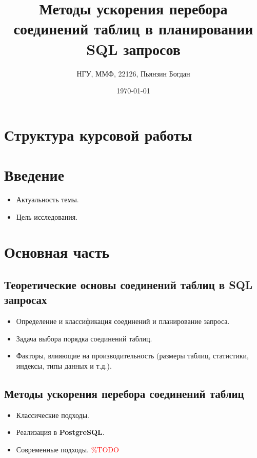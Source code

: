 \documentclass[12pt]{article}
\title{Методы ускорения перебора соединений таблиц в планировании SQL запросов}
\author{НГУ, ММФ, 22126, Пьянзин Богдан}
\date{\today}
\begin{document}
\begin{flushleft}
\maketitle

\newpage


\section*{Структура курсовой работы}  %

\section*{Введение}
\begin{itemize}
    \item Актуальность темы.
    \item Цель исследования.
\end{itemize}

\section*{Основная часть}

\subsection*{Теоретические основы соединений таблиц в SQL запросах}
\begin{itemize}
    \item Определение и классификация соединений и планирование запроса.
    \item Задача выбора порядка соединений таблиц.
    \item Факторы, влияющие на производительность (размеры таблиц, статистики, индексы, типы данных и т.д.).
\end{itemize}

\subsection*{Методы ускорения перебора соединений таблиц}
\begin{itemize}
    \item Классические подходы.
    \item Реализация в \textbf{PostgreSQL}.
    \item Современные подходы. \textcolor{red}{\%TODO}
\end{itemize}


\end{flushleft}
\end{document}
